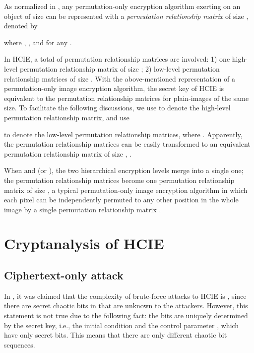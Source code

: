 \documentclass[final,3p,times,twocolumn]{elsarticle}
\begin{document}
As normalized in \cite{Li:Permutation:SPIC2008}, any permutation-only encryption algorithm exerting on
an object of size  can be represented with a \textit{permutation relationship matrix} of size
, denoted by

where ,
, and
 for any .

In HCIE, a total of
 permutation relationship
matrices are involved: 1) one high-level permutation relationship matrix of
size ; 2)
 low-level
permutation relationship matrices of size . With the
above-mentioned representation of a permutation-only image encryption algorithm,
the secret key  of HCIE is equivalent to the
 permutation relationship matrices
for plain-images of the same size. To facilitate the following discussions, we use
 to denote
the high-level permutation relationship matrix, and use

to denote the 
low-level permutation relationship matrices, where
.
Apparently, the 
permutation relationship matrices can be easily transformed to an equivalent
permutation relationship matrix of size , .

When  and  (or ), the two hierarchical
encryption levels merge into a single one; the
 permutation relationship matrices become one permutation relationship matrix of size ,
a typical permutation-only image encryption algorithm in which each pixel can be independently
permuted to any other position in the whole image by a single
 permutation relationship matrix .

\section{Cryptanalysis of HCIE}
\label{sec:cryptanalysisHCIE2}

\subsection{Ciphertext-only attack}

In \cite{Yen-Guo:HCIE:IEEPVISP2000}, it was claimed that the complexity of
brute-force attacks to HCIE is , since
there are
 secret chaotic bits in  that are
unknown to the attackers. However, this statement is not true due to
the following fact: the  bits are uniquely determined by the
secret key, i.e., the initial condition  and the control
parameter , which have only  secret bits. This means that
there are only  different chaotic bit sequences.
\end{document}
